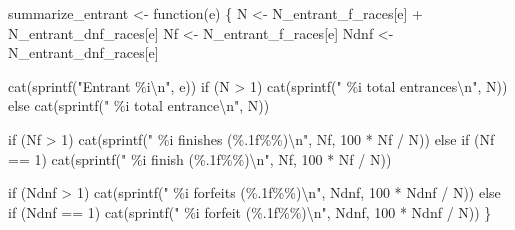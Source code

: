\documentclass[
  letterpaper,
  DIV=11,
  numbers=noendperiod]{scrartcl}
\newenvironment{Shaded}{\begin{snugshade}}{\end{snugshade}}
\newcommand{\ControlFlowTok}[1]{\textcolor[rgb]{0.00,0.23,0.31}{#1}}
\newcommand{\DecValTok}[1]{\textcolor[rgb]{0.68,0.00,0.00}{#1}}
\newcommand{\FunctionTok}[1]{\textcolor[rgb]{0.28,0.35,0.67}{#1}}
\newcommand{\NormalTok}[1]{\textcolor[rgb]{0.00,0.23,0.31}{#1}}
\newcommand{\OtherTok}[1]{\textcolor[rgb]{0.00,0.23,0.31}{#1}}
\newcommand{\SpecialCharTok}[1]{\textcolor[rgb]{0.37,0.37,0.37}{#1}}
\newcommand{\StringTok}[1]{\textcolor[rgb]{0.13,0.47,0.30}{#1}}
\begin{document}
\begin{Shaded}
\begin{Highlighting}[]
\NormalTok{summarize\_entrant }\OtherTok{\textless{}{-}} \ControlFlowTok{function}\NormalTok{(e) \{}
\NormalTok{  N }\OtherTok{\textless{}{-}}\NormalTok{ N\_entrant\_f\_races[e] }\SpecialCharTok{+}\NormalTok{ N\_entrant\_dnf\_races[e]}
\NormalTok{  Nf }\OtherTok{\textless{}{-}}\NormalTok{ N\_entrant\_f\_races[e]}
\NormalTok{  Ndnf }\OtherTok{\textless{}{-}}\NormalTok{ N\_entrant\_dnf\_races[e]}

  \FunctionTok{cat}\NormalTok{(}\FunctionTok{sprintf}\NormalTok{(}\StringTok{"Entrant \%i}\SpecialCharTok{\textbackslash{}n}\StringTok{"}\NormalTok{, e))}
  \ControlFlowTok{if}\NormalTok{ (N }\SpecialCharTok{\textgreater{}} \DecValTok{1}\NormalTok{)}
    \FunctionTok{cat}\NormalTok{(}\FunctionTok{sprintf}\NormalTok{(}\StringTok{"  \%i total entrances}\SpecialCharTok{\textbackslash{}n}\StringTok{"}\NormalTok{, N))}
  \ControlFlowTok{else}
    \FunctionTok{cat}\NormalTok{(}\FunctionTok{sprintf}\NormalTok{(}\StringTok{"  \%i total entrance}\SpecialCharTok{\textbackslash{}n}\StringTok{"}\NormalTok{, N))}

  \ControlFlowTok{if}\NormalTok{ (Nf }\SpecialCharTok{\textgreater{}} \DecValTok{1}\NormalTok{)}
    \FunctionTok{cat}\NormalTok{(}\FunctionTok{sprintf}\NormalTok{(}\StringTok{"  \%i finishes (\%.1f\%\%)}\SpecialCharTok{\textbackslash{}n}\StringTok{"}\NormalTok{, Nf, }\DecValTok{100} \SpecialCharTok{*}\NormalTok{ Nf }\SpecialCharTok{/}\NormalTok{ N))}
  \ControlFlowTok{else} \ControlFlowTok{if}\NormalTok{ (Nf }\SpecialCharTok{==} \DecValTok{1}\NormalTok{)}
    \FunctionTok{cat}\NormalTok{(}\FunctionTok{sprintf}\NormalTok{(}\StringTok{"  \%i finish (\%.1f\%\%)}\SpecialCharTok{\textbackslash{}n}\StringTok{"}\NormalTok{, Nf, }\DecValTok{100} \SpecialCharTok{*}\NormalTok{ Nf }\SpecialCharTok{/}\NormalTok{ N))}

  \ControlFlowTok{if}\NormalTok{ (Ndnf }\SpecialCharTok{\textgreater{}} \DecValTok{1}\NormalTok{)}
    \FunctionTok{cat}\NormalTok{(}\FunctionTok{sprintf}\NormalTok{(}\StringTok{"  \%i forfeits (\%.1f\%\%)}\SpecialCharTok{\textbackslash{}n}\StringTok{"}\NormalTok{, Ndnf, }\DecValTok{100} \SpecialCharTok{*}\NormalTok{ Ndnf }\SpecialCharTok{/}\NormalTok{ N))}
  \ControlFlowTok{else} \ControlFlowTok{if}\NormalTok{ (Ndnf }\SpecialCharTok{==} \DecValTok{1}\NormalTok{)}
    \FunctionTok{cat}\NormalTok{(}\FunctionTok{sprintf}\NormalTok{(}\StringTok{"  \%i forfeit (\%.1f\%\%)}\SpecialCharTok{\textbackslash{}n}\StringTok{"}\NormalTok{, Ndnf, }\DecValTok{100} \SpecialCharTok{*}\NormalTok{ Ndnf }\SpecialCharTok{/}\NormalTok{ N))}
\NormalTok{\}}
\end{Highlighting}
\end{Shaded}
\end{document}
